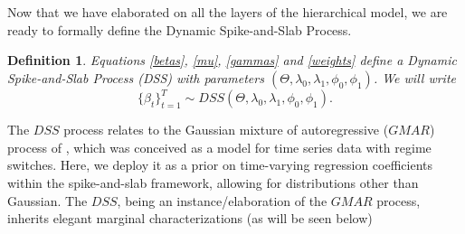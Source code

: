 \documentclass[ba]{imsart}
\numberwithin{equation}{section}
\theoremstyle{plain}
\newtheorem{definition}{Definition}
\begin{document}


\smallskip

Now that we have elaborated on all the layers of the hierarchical model, we are ready to formally define the Dynamic Spike-and-Slab Process.

\begin{definition}
Equations \eqref{betas}, \eqref{mu}, \eqref{gammas} and \eqref{weights} define a
Dynamic Spike-and-Slab  Process (DSS) 
with parameters
$(\Theta,\lambda_0,\lambda_1,\phi_{0},\phi_{1})$.
We will write
$$
\{\beta_{t}\}_{t=1}^T\sim DSS(\Theta,\lambda_0,\lambda_1,\phi_{0},\phi_{1}).
$$
\end{definition}
The $DSS$ process relates to the Gaussian mixture of autoregressive ($GMAR$) process of \cite{kalli}, which was conceived as a model for time series data with regime switches. Here, we deploy it as a prior on time-varying regression coefficients within the spike-and-slab framework, allowing for {distributions} other than Gaussian. The $DSS$, being an instance/elaboration of the $GMAR$ process,  inherits elegant marginal characterizations (as will be seen below)
\end{document}
